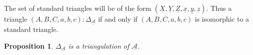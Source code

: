 \documentclass[12pt]{article}
\newtheorem{prop}[theorem]{Proposition}
\theoremstyle{definition}
\theoremstyle{remark}
\begin{document}
            \begin{minipage}[c]{0.6\textwidth}
                \begin{center}
                \end{center}
            \end{minipage}
            \begin{minipage}[c]{0.4\textwidth}
                The set of standard triangles will be of the form $(\underline{X},\underline{Y},\underline{Z},\underline{x},\underline{y},\underline{z})$. Thus a triangle $(A,B,C,a,b,c):\Delta_{\underline{\mathcal{A}}}$ if and only if $(A,B,C,a,b,c)$ is isomorphic to a standard triangle.
            \end{minipage}

            \begin{prop}
                $\Delta_{\underline{\mathcal{A}}}$ is a triangulation of $\underline{\mathcal{A}}$.
            \end{prop}
\end{document}
